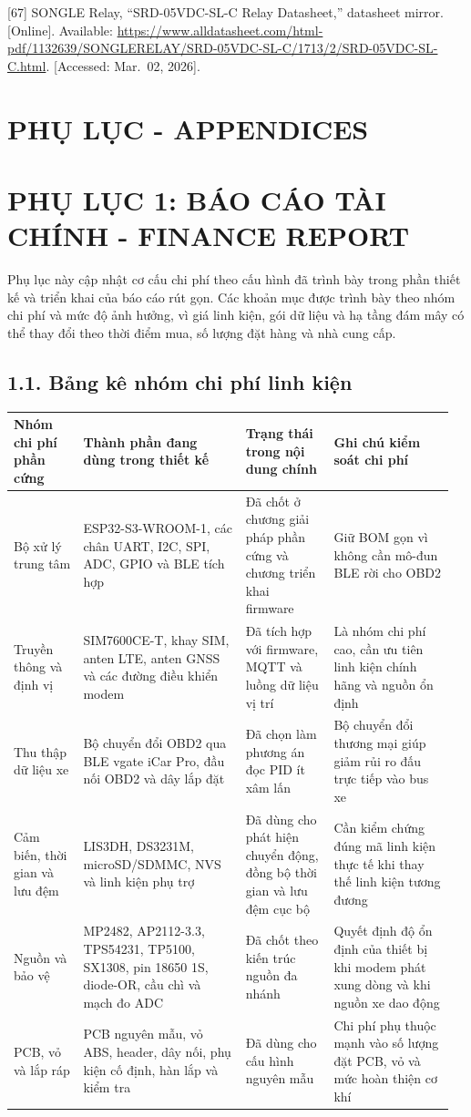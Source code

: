 \documentclass[a4paper]{extarticle}
\newcounter{none} %
\newcommand{\majorheading}[1]{%
  \clearpage
  \phantomsection
  \section*{#1}%
  \addcontentsline{toc}{section}{#1}%
}
\newcommand{\appendixsection}[1]{\clearpage\section{#1}}
\begin{document}
{[}67{]} SONGLE Relay, ``SRD-05VDC-SL-C Relay Datasheet,'' datasheet mirror.
{[}Online{]}. Available:
\url{https://www.alldatasheet.com/html-pdf/1132639/SONGLERELAY/SRD-05VDC-SL-C/1713/2/SRD-05VDC-SL-C.html}.
{[}Accessed: Mar.~02, 2026{]}.


\majorheading{PHỤ LỤC - APPENDICES}


\appendixsection{PHỤ LỤC 1: BÁO CÁO TÀI CHÍNH - FINANCE REPORT}

Phụ lục này cập nhật cơ cấu chi phí theo cấu hình đã trình bày trong phần thiết
kế và triển khai của báo cáo rút gọn. Các khoản mục được trình bày theo nhóm
chi phí và mức độ ảnh hưởng, vì giá linh kiện, gói dữ liệu và hạ tầng đám mây có
thể thay đổi theo thời điểm mua, số lượng đặt hàng và nhà cung cấp.

\subsection{1.1. Bảng kê nhóm chi phí linh kiện}\label{app1-bom-cap-nhat}

{\def\LTcaptype{none} %
\begin{longtable}{|L{0.155\linewidth}|L{0.355\linewidth}|L{0.190\linewidth}|L{0.260\linewidth}|}
\hline
\textbf{Nhóm chi phí phần cứng} & \textbf{Thành phần đang dùng trong thiết kế} & \textbf{Trạng thái trong nội dung chính} & \textbf{Ghi chú kiểm soát chi phí} \\
\hline
\endhead
\endfoot
\endlastfoot
Bộ xử lý trung tâm & ESP32-S3-WROOM-1, các chân UART, I2C, SPI, ADC, GPIO và BLE tích hợp & Đã chốt ở chương giải pháp phần cứng và chương triển khai firmware & Giữ BOM gọn vì không cần mô-đun BLE rời cho OBD2 \\\hline
Truyền thông và định vị & SIM7600CE-T, khay SIM, anten LTE, anten GNSS và các đường điều khiển modem & Đã tích hợp với firmware, MQTT và luồng dữ liệu vị trí & Là nhóm chi phí cao, cần ưu tiên linh kiện chính hãng và nguồn ổn định \\\hline
Thu thập dữ liệu xe & Bộ chuyển đổi OBD2 qua BLE vgate iCar Pro, đầu nối OBD2 và dây lắp đặt & Đã chọn làm phương án đọc PID ít xâm lấn & Bộ chuyển đổi thương mại giúp giảm rủi ro đấu trực tiếp vào bus xe \\\hline
Cảm biến, thời gian và lưu đệm & LIS3DH, DS3231M, microSD/SDMMC, NVS và linh kiện phụ trợ & Đã dùng cho phát hiện chuyển động, đồng bộ thời gian và lưu đệm cục bộ & Cần kiểm chứng đúng mã linh kiện thực tế khi thay thế linh kiện tương đương \\\hline
Nguồn và bảo vệ & MP2482, AP2112-3.3, TPS54231, TP5100, SX1308, pin 18650 1S, diode-OR, cầu chì và mạch đo ADC & Đã chốt theo kiến trúc nguồn đa nhánh & Quyết định độ ổn định của thiết bị khi modem phát xung dòng và khi nguồn xe dao động \\\hline
PCB, vỏ và lắp ráp & PCB nguyên mẫu, vỏ ABS, header, dây nối, phụ kiện cố định, hàn lắp và kiểm tra & Đã dùng cho cấu hình nguyên mẫu & Chi phí phụ thuộc mạnh vào số lượng đặt PCB, vỏ và mức hoàn thiện cơ khí \\\hline
\end{longtable}
}
\end{document}
